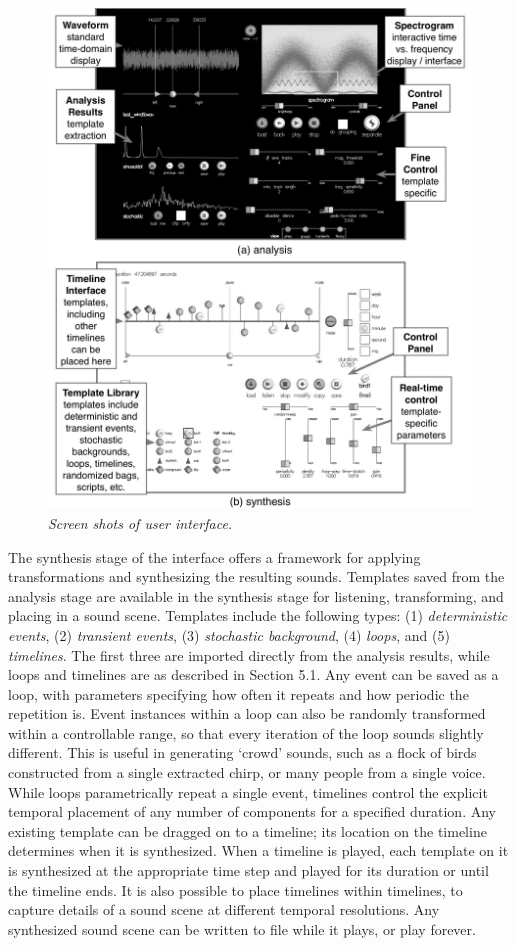 \documentclass[twoside]{article}
\begin{document}
\begin{figure}[t]
\setlength\textfloatsep{0pt}
\setlength\abovecaptionskip{0pt}
\setlength\belowcaptionskip{0pt}
\centering
\includegraphics[width=.5\textwidth]{ui2b.jpg}
\caption{\it Screen shots of user interface. 
} %
\label{fig:ui}
\end{figure}
The synthesis stage of the interface offers a framework for applying 
transformations and synthesizing the resulting sounds. Templates 
saved from the analysis stage are available in the synthesis stage for 
listening, transforming, and placing in a sound scene. Templates 
include the following types: (1) \emph{deterministic events}, (2) \emph{transient events}, (3) 
\emph{stochastic background}, (4) \emph{loops}, and (5) \emph{timelines}. 
The first three are imported directly from the analysis results, while loops 
and timelines are as described in Section 5.1. 
Any event can be saved as a loop, with parameters specifying how often it repeats 
and how periodic the repetition is. Event instances within a loop can also be 
randomly transformed within a controllable range, so that every 
iteration of the loop sounds slightly different. This is useful in 
generating `crowd' sounds, such as a flock of birds constructed from a 
single extracted chirp, or many people from a single voice. 
While loops parametrically repeat a single event, timelines control the explicit  
temporal placement of any number of components for a specified duration.  
Any existing template can be dragged on to a timeline; its location on the 
timeline determines when it is synthesized. 
When a timeline is played, each template on it is synthesized at the appropriate 
time step and played for its duration or until the timeline ends. 
It is also possible to place 
timelines within timelines, to capture details of a sound scene at different 
temporal resolutions. Any synthesized sound scene can be written to file while it 
plays, or play forever.  
\end{document}
